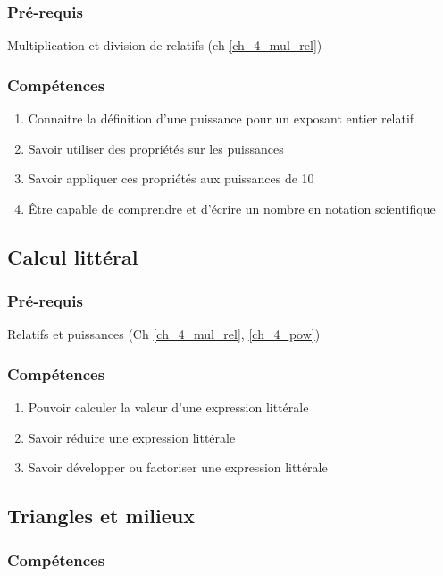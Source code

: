 \subsubsection*{Pré-requis}
Multiplication et division de relatifs (ch \ref{ch_4_mul_rel})

\subsubsection*{Compétences}
\begin{enumerate}
	\item Connaitre la définition d'une puissance pour un exposant entier relatif
	\item Savoir utiliser des propriétés sur les puissances 
	\item Savoir appliquer ces propriétés aux puissances de 10
	\item Être capable de comprendre et d'écrire un nombre en notation scientifique
\end{enumerate}

\subsection{Calcul littéral}\label{ch_4_lit}

\subsubsection*{Pré-requis}
 Relatifs et puissances (Ch \ref{ch_4_mul_rel}, \ref{ch_4_pow})
 
 \subsubsection*{Compétences}
\begin{enumerate}
	\item Pouvoir calculer la valeur d'une expression littérale
	\item Savoir réduire une expression littérale
	\item Savoir développer ou factoriser une expression littérale
\end{enumerate}


\subsection{Triangles et milieux}\label{ch_4_mileux}

\subsubsection*{Compétences}

